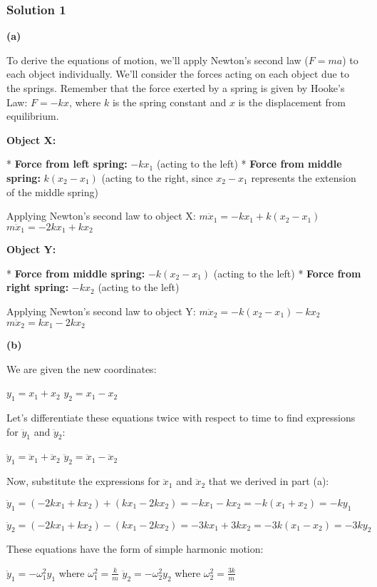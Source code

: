 \documentclass{article}
\begin{document}
\subsubsection{Solution 1}
\textbf{(a)} 

To derive the equations of motion, we'll apply Newton's second law ($F=ma$) to each object individually.  We'll consider the forces acting on each object due to the springs. Remember that the force exerted by a spring is given by Hooke's Law: $F = -kx$, where $k$ is the spring constant and $x$ is the displacement from equilibrium.

\textbf{Object X:}

* \textbf{Force from left spring:}  $-kx_1$ (acting to the left)
* \textbf{Force from middle spring:} $k(x_2 - x_1)$ (acting to the right, since $x_2 - x_1$ represents the extension of the middle spring)

Applying Newton's second law to object X:
$m\ddot{x}_1 = -kx_1 + k(x_2 - x_1)$
$m\ddot{x}_1 = -2kx_1 + kx_2$ 

\textbf{Object Y:}

* \textbf{Force from middle spring:} $-k(x_2 - x_1)$ (acting to the left)
* \textbf{Force from right spring:} $-kx_2$ (acting to the left)

Applying Newton's second law to object Y:
$m\ddot{x}_2 = -k(x_2 - x_1) - kx_2$
$m\ddot{x}_2 = kx_1 - 2kx_2$

\textbf{(b)}

We are given the new coordinates:

$y_1 = x_1 + x_2$ 
$y_2 = x_1 - x_2$

Let's differentiate these equations twice with respect to time to find expressions for $\ddot{y}_1$ and $\ddot{y}_2$:

$\ddot{y}_1 = \ddot{x}_1 + \ddot{x}_2$
$\ddot{y}_2 = \ddot{x}_1 - \ddot{x}_2$

Now, substitute the expressions for $\ddot{x}_1$ and $\ddot{x}_2$ that we derived in part (a):

$\ddot{y}_1 = (-2kx_1 + kx_2) + (kx_1 - 2kx_2) = -kx_1 - kx_2 = -k(x_1 + x_2) = -ky_1$

$\ddot{y}_2 = (-2kx_1 + kx_2) - (kx_1 - 2kx_2) = -3kx_1 + 3kx_2 = -3k(x_1 - x_2) = -3ky_2$

These equations have the form of simple harmonic motion:

$\ddot{y}_1 = -\omega_1^2 y_1$ where $\omega_1^2 = \frac{k}{m}$
$\ddot{y}_2 = -\omega_2^2 y_2$ where $\omega_2^2 = \frac{3k}{m}$
\end{document}
